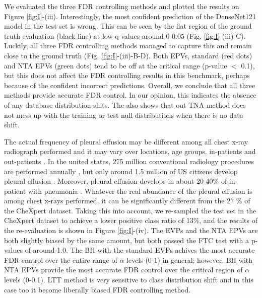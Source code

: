 \documentclass{article}
\begin{document}
We evaluated the three FDR controlling methods and plotted the results on Figure \ref{fig:I}-(iii). Interestingly, the most confident prediction of the DenseNet121 model in the test set is wrong. This can be seen by the flat region of the ground truth evaluation (black line) at low q-values around 0-0.05 (Fig, \ref{fig:I}-(iii)-C). Luckily, all three FDR controlling methods managed to capture this and remain close to the ground truth (Fig, \ref{fig:I}-(iii)-B-D). Both EPVs, standard (red dots) and NTA EPVs (green dots) tend to be off at the critical range (p-value $<$ 0.1), but this does not affect the FDR controlling results in this benchmark, perhaps because of the confident incorrect predictions. Overall, we conclude that all three methods provide accurate FDR control. In our opinion, this indicates the absence of any database distribution shits. The also shows that out TNA method does not mess up with the training or test null distributions when there is no data shift.

The actual frequency of pleural effusion may be different among all chest x-ray radiograph performed and it may vary over locations, age groups, in-patients and out-patients \cite{Zaki2024,Cashen2017PleuralEA}. In the united states, 275 million conventional radiology procedures are performed annually \cite{mahesh2022patient}, but only around 1.5 million of US citizens develop pleural effusion \cite{Cashen2017PleuralEA}. Moreover, pleural effusion develops in about 20-40\% of in-patient with pneumonia \cite{shebl2018parapneumonic}. Whatever the real abundance of the pleural effusion is among  chest x-rays performed, it can be significantly different from the 27 \% of the CheXpert dataset. Taking this into account, we re-sampled the test set in the CheXpert dataset to achieve a lower positive class ratio of 13\%, and the results of the re-evaluation is shown in Figure \ref{fig:I}-(iv). The EVPs and the NTA EPVs are both slightly biased by the same amount, but both passed the FTC test with a p-values of around 1.0. The BH with the standard EVPs achives the most accurate FDR control over the entire range of $\alpha$ levels (0-1) in general; however, BH with NTA EPVs provide the most accurate FDR control over the critical region of  $\alpha$ levels (0-0.1). LTT method is very sensitive to class distribution shift and in this case too it become liberally biased FDR controlling method.


\end{document}
